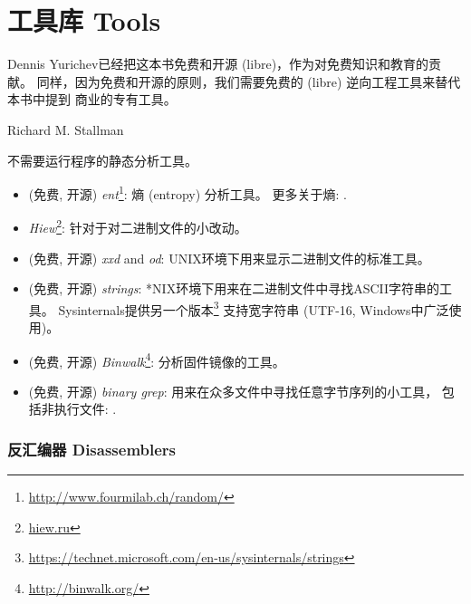 \documentclass[UTF8,nofonts]{ctexart}
\begin{document}

\chapter{工具库 Tools}

\epigraph{
Dennis Yurichev已经把这本书免费和开源 (libre)，作为对免费知识和教育的贡献。
同样，因为免费和开源的原则，我们需要免费的 (libre) 逆向工程工具来替代本书中提到
商业的专有工具。}{Richard M. Stallman}


不需要运行程序的静态分析工具。


\begin{itemize}
\item
(免费, 开源) \emph{ent}\footnote{\url{http://www.fourmilab.ch/random/}}: 熵 (entropy) 分析工具。
更多关于熵: .

\item
\label{Hiew}
\emph{Hiew}\footnote{\href{http://go.yurichev.com/17035}{hiew.ru}}:
针对于对二进制文件的小改动。

\item (免费, 开源) \emph{xxd} and \emph{od}: UNIX环境下用来显示二进制文件的标准工具。

\item (免费, 开源) \emph{strings}: *NIX环境下用来在二进制文件中寻找ASCII字符串的工具。
Sysinternals提供另一个版本\footnote{\url{https://technet.microsoft.com/en-us/sysinternals/strings}}
支持宽字符串 (UTF-16, Windows中广泛使用)。

\item (免费, 开源) \emph{Binwalk}\footnote{\url{http://binwalk.org/}}: 分析固件镜像的工具。

\item
{}
(免费, 开源) \emph{binary grep}:
用来在众多文件中寻找任意字节序列的小工具，
包括非执行文件: \BGREPURL.
\end{itemize}

\subsection{反汇编器 Disassemblers}

\end{document}
